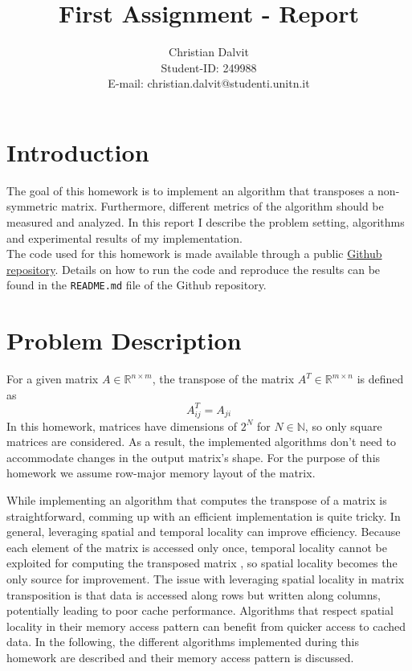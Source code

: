 \documentclass{scrartcl}
\title{First Assignment - Report}
\author{
    Christian Dalvit\\
    {\small Student-ID: 249988}\\
    {\small E-mail: christian.dalvit@studenti.unitn.it}
}
\begin{document}
    \maketitle
    \section{Introduction}    
    The goal of this homework is to implement an algorithm that transposes a non-symmetric matrix. Furthermore, different metrics of the algorithm should be measured and analyzed. In this report I describe the problem setting, algorithms and experimental results of my implementation.\\
    The code used for this homework is made available through a public \href{https://github.com/chrisdalvit/matrix-transpose-benchmark}{Github repository}. Details on how to run the code and reproduce the results can be found in the \texttt{README.md} file of the Github repository.

    \section{Problem Description}
    For a given matrix $A \in \mathbb{R}^{n \times m}$, the transpose of the matrix $A^T \in \mathbb{R}^{m \times n}$ is defined as
    $$
        A^T_{ij} = A_{ji}
    $$
    In this homework, matrices have dimensions of $2^N$ for $N \in \mathbb{N}$, so only square matrices are considered. As a result, the implemented algorithms don't need to accommodate changes in the output matrix's shape. For the purpose of this homework we assume row-major memory layout of the matrix.

    While implementing an algorithm that computes the transpose of a matrix is straightforward, comming up with an efficient implementation is quite tricky. In general, leveraging spatial and temporal locality can improve efficiency. Because each element of the matrix is accessed only once, temporal locality cannot be exploited for computing the transposed matrix \cite{chatterjee2000cache}, so spatial locality becomes the only source for improvement. The issue with leveraging spatial locality in matrix transposition is that data is accessed along rows but written along columns, potentially leading to poor cache performance. Algorithms that respect spatial locality in their memory access pattern can benefit from quicker access to cached data. In the following, the different algorithms implemented during this homework are described and their memory access pattern is discussed.
\end{document}
